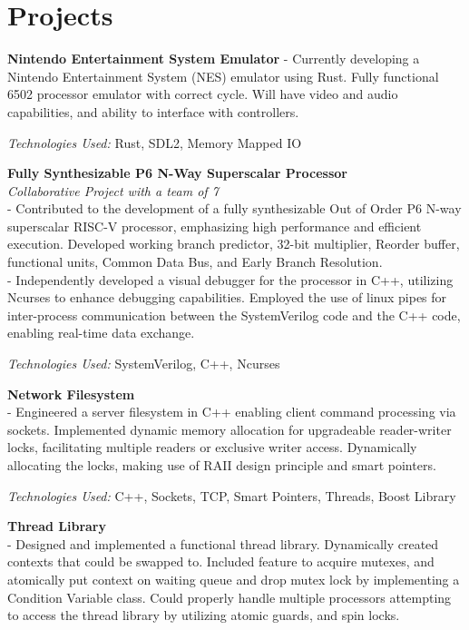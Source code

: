\documentclass[9pt]{extarticle}
\begin{document}
\section*{Projects}
\noindent \textbf{Nintendo Entertainment System Emulator}
- Currently developing a Nintendo Entertainment System (NES) emulator using Rust.
Fully functional 6502 processor emulator with correct cycle. Will have video and audio capabilities, and ability to interface with controllers.

\indent \textit{Technologies Used:} Rust, SDL2, Memory Mapped IO

\noindent \textbf{Fully Synthesizable P6 N-Way Superscalar Processor} \\
\textit{Collaborative Project with a team of 7} \\
- Contributed to the development of a fully synthesizable Out of Order P6 N-way superscalar RISC-V processor, emphasizing high performance and efficient execution.
Developed working branch predictor, 32-bit multiplier, Reorder buffer, functional units, Common Data Bus, and Early Branch Resolution.  \\
- Independently developed a visual debugger for the processor in C++,
utilizing Ncurses to enhance debugging capabilities.
Employed the use of linux pipes for inter-process communication between the SystemVerilog code
and the C++ code, enabling real-time data exchange.

\textit{Technologies Used:} SystemVerilog, C++, Ncurses

\noindent \textbf{Network Filesystem} \\
- Engineered a server filesystem in C++ enabling client command processing via sockets.
Implemented dynamic memory allocation for upgradeable reader-writer locks,
facilitating multiple readers or exclusive writer access. Dynamically allocating the locks, making use of RAII design principle and smart pointers.

\textit{Technologies Used:} C++, Sockets, TCP, Smart Pointers, Threads, Boost Library

\noindent \textbf{Thread Library} \\
- Designed and implemented a functional thread library. Dynamically created contexts that could be swapped to.
Included feature to acquire mutexes, and atomically put context on waiting queue and drop mutex lock by implementing a Condition Variable class.
Could properly handle multiple processors attempting to access the thread library by utilizing atomic guards, and spin locks.
\end{document}
